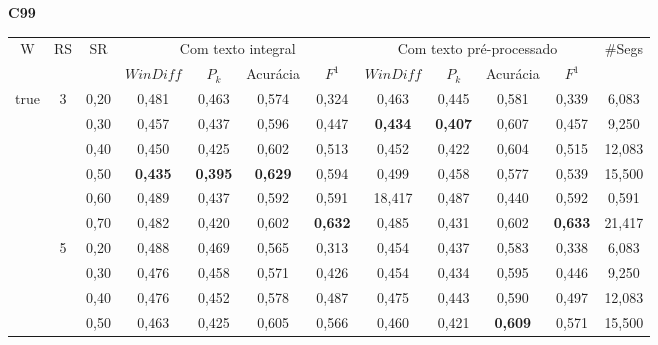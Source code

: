 
\begin{table}[!h]
	\tiny \center
	\textbf{C99}  \\
	\begin{tabular}{|c|c|c||c|c|c|c||c|c|c|c||c|} 
\hline 
\multirow{2}{*}{W} & \multirow{2}{*}{RS} & \multirow{2}{*}{SR} & \multicolumn{4}{c||}{Com texto integral} & \multicolumn{4}{c||}{Com texto pré-processado}& \multirow{2}{*}{\#Segs} \\\cline{4-11}

&& & $WinDiff$ & $P_k$ & Acurácia & $F^1$ & $WinDiff$ & $P_k$ & Acurácia & $F^1$ & \\ \hline 
 \multirow{18}{*}{true} & \multirow{6}{*}{3} 
	 & 0,20    & 0,481 & 0,463 & 0,574 & 0,324         &     0,463 &  0,445 & 0,581 & 0,339 & 6,083                \\ \cline{3-12}
	&& 0,30    & 0,457 & 0,437 & 0,596 & 0,447         &     \cellcolor{gray!20} \textbf{0,434} & \cellcolor{gray!20} \textbf{0,407} & 0,607 & 0,457 & 9,250  \\\cline{3-12} 
	&& 0,40    & 0,450 & 0,425 & 0,602 & 0,513         &     0,452 &  0,422 & 0,604 & 0,515 & 12,083              \\ \cline{3-12}                                            
	&& 0,50    & \cellcolor{gray!20} \textbf{0,435} & \cellcolor{gray!20} \textbf{0,395} & \cellcolor{gray!20} \textbf{0,629} & 0,594  &     0,499 &  0,458 & 0,577 & 0,539 & 15,500              \\ \cline{3-12}
	&& 0,60    & 0,489 & 0,437 & 0,592 & 0,591 & 18,417                                &     0,487 &  0,440 & 0,592 & 0,591               \\ \cline{3-12}                 
	&& 0,70    & 0,482 & 0,420 & 0,602 & \cellcolor{gray!20} \textbf{0,632} &    0,485 &  0,431 & 0,602 & \cellcolor{gray!20} \textbf{0,633} & 21,417 \\ \cline{2-12} 
 & \multirow{6}{*}{5} 
	  & 0,20    & 0,488 & 0,469 & 0,565 & 0,313         &     0,454 &  0,437 & 0,583 & 0,338 & 6,083               \\ \cline{3-12}                  
	 && 0,30    & 0,476 & 0,458 & 0,571 & 0,426         &     0,454 &  0,434 & 0,595 & 0,446 & 9,250               \\ \cline{3-12}                  
	 && 0,40    & 0,476 & 0,452 & 0,578 & 0,487         &     0,475 &  0,443 & 0,590 & 0,497 & 12,083              \\ \cline{3-12}                  
	 && 0,50    & 0,463 & 0,425 & 0,605 & 0,566         &     0,460 &  0,421 & \cellcolor{gray!20} \textbf{0,609} & 0,571 & 15,500  \\ \cline{3-12} 

\end{tabular}
\end{table}
